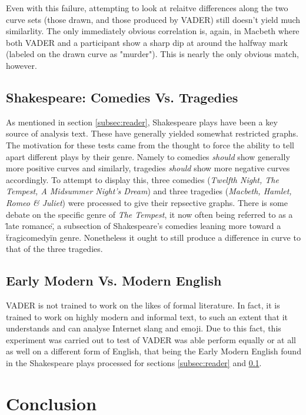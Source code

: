 \documentclass{article}
\begin{document}
            Even with this failure, attempting to look at relaitve differences along the two curve sets (those drawn, and those produced by VADER) still doesn't yield much similarlity. The only immediately obvious correlation is, again, in Macbeth where both VADER and a participant show a sharp dip at around the halfway mark (labeled on the drawn curve as "murder"). This is nearly the only obvious match, however.
    \subsection{Shakespeare: Comedies Vs. Tragedies}
    \label{subsec:comVsTrag}
        As mentioned in section \ref{subsec:reader}, Shakespeare plays have been a key source of analysis text. These have generally yielded somewhat restricted graphs. The motivation for these tests came from the thought to force the ability to tell apart different plays by their genre. Namely to comedies \emph{should} show generally more positive curves and similarly, tragedies \emph{should} show more negative curves accordingly. To attempt to display this, three comedies (\emph{Twelfth Night, The Tempest, A Midsummer Night's Dream}) and three tragedies (\emph{Macbeth, Hamlet, Romeo \& Juliet}) were processed to give their repsective graphs. There is some debate on the specific genre of \emph{The Tempest}, it now often being referred to as a \"late romance\", a subsection of Shakespeare's comedies leaning more toward a \"tragicomedy\" in genre. Nonetheless it ought to still produce a difference in curve to that of the three tragedies.
    \subsection{Early Modern Vs. Modern English}
        VADER is not trained to work on the likes of formal literature. In fact, it is trained to work on highly modern and informal text, to such an extent that it understands and can analyse Internet slang and emoji. Due to this fact, this experiment was carried out to test of VADER was able perform equally or at all as well on a different form of English, that being the Early Modern English found in the Shakespeare plays processed for sections \ref{subsec:reader} and \ref{subsec:comVsTrag}.
\newpage
\section{Conclusion}
\label{sec:conclusion}
\newpage


\end{document}
